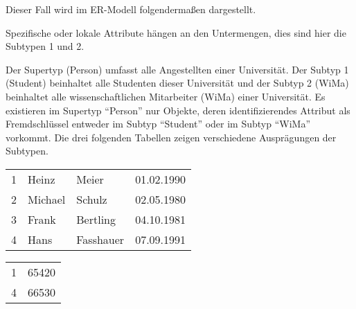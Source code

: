         Dieser Fall wird im ER-Modell folgenderma\ss en dargestellt.
        \begin{center}
        \end{center}
        \begin{merke}
          Spezifische oder lokale Attribute h\"angen an den Untermengen, dies sind hier die Subtypen 1 und 2.
        \end{merke}
          Der Supertyp (Person) umfasst alle Angestellten einer Universit\"at.
          Der Subtyp 1 (Student) beinhaltet alle Studenten dieser Universit\"at
          und der Subtyp 2 (WiMa) beinhaltet alle wissenschaftlichen Mitarbeiter
          (WiMa) einer Universit\"at. Es existieren im Supertyp \enquote{Person}
          nur Objekte, deren identifizierendes Attribut als Fremdschl\"ussel
          entweder im Subtyp \enquote{Student} oder im Subtyp \enquote{WiMa}
          vorkommt. Die drei folgenden Tabellen zeigen verschiedene
          Auspr\"agungen der Subtypen.
\clearpage
          \begin{supertabular}[h]{llll}
            1 & Heinz & Meier & 01.02.1990 \\
            2 & Michael & Schulz & 02.05.1980 \\
            3 & Frank & Bertling & 04.10.1981 \\
            4 & Hans & Fasshauer & 07.09.1991 \\
          \end{supertabular}

          \begin{supertabular}[h]{lp{5cm}}
            1 & 65420\\
            4 & 66530\\
          \end{supertabular}

